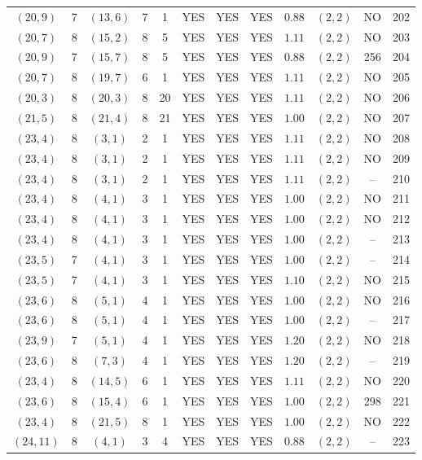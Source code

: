 \begin{longtable}{|c|c|c|c|c|c|c|c|c|c|c|c|}
$(20,9)$ & 7 & $(13,6)$ & 7 & 1 & YES & YES & YES & $0.88$ & $(2,2)$ & NO & 202\\
$(20,7)$ & 8 & $(15,2)$ & 8 & 5 & YES & YES & YES & $1.11$ & $(2,2)$ & NO & 203\\
$(20,9)$ & 7 & $(15,7)$ & 8 & 5 & YES & YES & YES & $0.88$ & $(2,2)$ & 256 & 204\\
$(20,7)$ & 8 & $(19,7)$ & 6 & 1 & YES & YES & YES & $1.11$ & $(2,2)$ & NO & 205\\
$(20,3)$ & 8 & $(20,3)$ & 8 & 20 & YES & YES & YES & $1.11$ & $(2,2)$ & NO & 206\\
$(21,5)$ & 8 & $(21,4)$ & 8 & 21 & YES & YES & YES & $1.00$ & $(2,2)$ & NO & 207\\
$(23,4)$ & 8 & $(3,1)$ & 2 & 1 & YES & YES & YES & $1.11$ & $(2,2)$ & NO & 208\\
$(23,4)$ & 8 & $(3,1)$ & 2 & 1 & YES & YES & YES & $1.11$ & $(2,2)$ & NO & 209\\
$(23,4)$ & 8 & $(3,1)$ & 2 & 1 & YES & YES & YES & $1.11$ & $(2,2)$ & -- & 210\\
$(23,4)$ & 8 & $(4,1)$ & 3 & 1 & YES & YES & YES & $1.00$ & $(2,2)$ & NO & 211\\
$(23,4)$ & 8 & $(4,1)$ & 3 & 1 & YES & YES & YES & $1.00$ & $(2,2)$ & NO & 212\\
$(23,4)$ & 8 & $(4,1)$ & 3 & 1 & YES & YES & YES & $1.00$ & $(2,2)$ & -- & 213\\
$(23,5)$ & 7 & $(4,1)$ & 3 & 1 & YES & YES & YES & $1.00$ & $(2,2)$ & -- & 214\\
$(23,5)$ & 7 & $(4,1)$ & 3 & 1 & YES & YES & YES & $1.10$ & $(2,2)$ & NO & 215\\
$(23,6)$ & 8 & $(5,1)$ & 4 & 1 & YES & YES & YES & $1.00$ & $(2,2)$ & NO & 216\\
$(23,6)$ & 8 & $(5,1)$ & 4 & 1 & YES & YES & YES & $1.00$ & $(2,2)$ & -- & 217\\
$(23,9)$ & 7 & $(5,1)$ & 4 & 1 & YES & YES & YES & $1.20$ & $(2,2)$ & NO & 218\\
$(23,6)$ & 8 & $(7,3)$ & 4 & 1 & YES & YES & YES & $1.20$ & $(2,2)$ & -- & 219\\
$(23,4)$ & 8 & $(14,5)$ & 6 & 1 & YES & YES & YES & $1.11$ & $(2,2)$ & NO & 220\\
$(23,6)$ & 8 & $(15,4)$ & 6 & 1 & YES & YES & YES & $1.00$ & $(2,2)$ & 298 & 221\\
$(23,4)$ & 8 & $(21,5)$ & 8 & 1 & YES & YES & YES & $1.00$ & $(2,2)$ & NO & 222\\
$(24,11)$ & 8 & $(4,1)$ & 3 & 4 & YES & YES & YES & $0.88$ & $(2,2)$ & -- & 223\\

\end{longtable}
